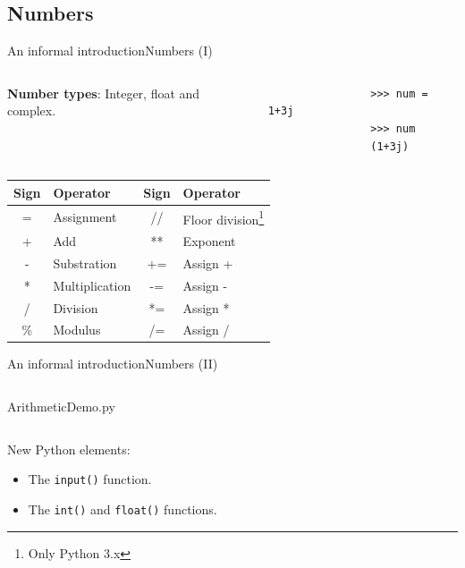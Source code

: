 \documentclass[10pt,compress]{beamer} %
\begin{document}
\subsection{Numbers}
\begin{frame}[fragile]{An informal introduction}{Numbers (I)}

\vspace{-0.2cm}
	\begin{columns}
	\textbf{Number types}: Integer, float and complex.

				\begin{block}{}
				\begin{verbatim}
				>>> num = 1+3j
				>>> num
				(1+3j)
				\end{verbatim}
				\end{block}
		\end{columns}

    \vspace{-0.2cm}
	\begin{center}
	\bigskip
		\centering \begin{tabular}{cl|cl}\hline
		\sc Sign & \sc Operator 	& \sc Sign 	& \sc Operator \\ \hline
		= 	 & Assignment   & // 	& Floor division\footnote{Only Python 3.x}\\
		+ 	& Add  			& **	& Exponent \\
		- 	& Substration 	& +=	& Assign + \\
		* 	& Multiplication& -=	& Assign - \\
		/ 	& Division 		& *=	& Assign * \\
		\% 	& Modulus 		& /=	& Assign /\\\hline
		\end{tabular}
	\end{center}
\end{frame}

\begin{frame}[fragile]{An informal introduction}{Numbers (II)}
    \begin{columns}
		\begin{block}{ArithmeticDemo.py}
		
		\end{block}
	\end{columns}

	\bigskip
    New Python elements:
    \begin{itemize}
        \item The \texttt{input()} function.
		\item The \texttt{int()} and \texttt{float()} functions.
    \end{itemize}
\end{frame}
\end{document}
